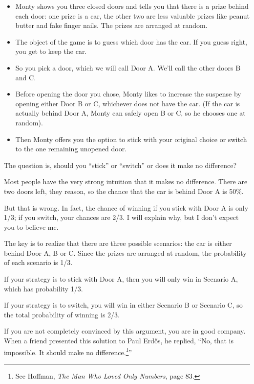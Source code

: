 \documentclass[12pt]{book}
\begin{document}
\begin{itemize}

\item Monty shows you three closed doors and tells you that there is a
  prize behind each door: one prize is a car, the other two are less
  valuable prizes like peanut butter and fake finger nails.  The
  prizes are arranged at random.

\item The object of the game is to guess which door has the car.  If
  you guess right, you get to keep the car.

\item So you pick a door, which we will call Door A.  We'll call the
  other doors B and C.

\item Before opening the door you chose, Monty likes to increase the
  suspense by opening either Door B or C, whichever does not
  have the car.  (If the car is actually behind Door A, Monty can
  safely open B or C, so he chooses one at random).

\item Then Monty offers you the option to stick with your original
  choice or switch to the one remaining unopened door.

\end{itemize}

The question is, should you ``stick'' or ``switch'' or does it
make no difference?

Most people have the very strong intuition that it makes no difference.
There are two doors left, they reason, so the chance that the car
is behind Door A is 50\%.

But that is wrong.  In fact, the chance of winning if you stick
with Door A is only 1/3; if you switch, your chances are 2/3.
I will explain why, but I don't expect you to believe me.

The key is to realize that there are three possible scenarios:
the car is either behind Door A, B or C.  Since the prizes are
arranged at random, the probability of each scenario is 1/3.

If your strategy is to stick with Door A, then you will only
win in Scenario A, which has probability 1/3.

If your strategy is to switch, you will win in either Scenario
B or Scenario C, so the total probability of winning is 2/3.

\newcommand{\Erdos}{Erd\H{o}s}

If you are not completely convinced by this argument, you are
in good company.  When a friend presented this solution to
Paul \Erdos, he replied, ``No, that is impossible.  It should
make no difference.\footnote{See Hoffman, {\em The Man Who Loved
Only Numbers}, page 83.}''
\end{document}
